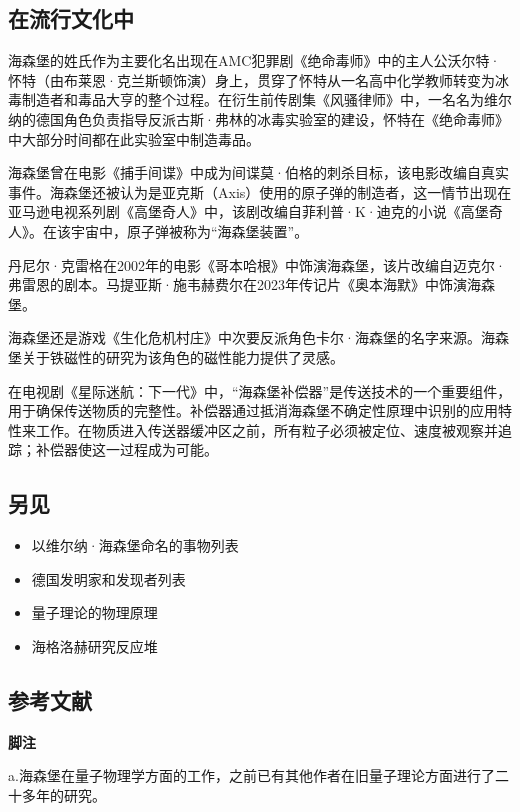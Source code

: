 \subsection{在流行文化中}
海森堡的姓氏作为主要化名出现在AMC犯罪剧《绝命毒师》中的主人公沃尔特·怀特（由布莱恩·克兰斯顿饰演）身上，贯穿了怀特从一名高中化学教师转变为冰毒制造者和毒品大亨的整个过程。在衍生前传剧集《风骚律师》中，一名名为维尔纳的德国角色负责指导反派古斯·弗林的冰毒实验室的建设，怀特在《绝命毒师》中大部分时间都在此实验室中制造毒品。

海森堡曾在电影《捕手间谍》中成为间谍莫·伯格的刺杀目标，该电影改编自真实事件。海森堡还被认为是亚克斯（Axis）使用的原子弹的制造者，这一情节出现在亚马逊电视系列剧《高堡奇人》中，该剧改编自菲利普·K·迪克的小说《高堡奇人》。在该宇宙中，原子弹被称为“海森堡装置”。

丹尼尔·克雷格在2002年的电影《哥本哈根》中饰演海森堡，该片改编自迈克尔·弗雷恩的剧本。马提亚斯·施韦赫费尔在2023年传记片《奥本海默》中饰演海森堡。

海森堡还是游戏《生化危机村庄》中次要反派角色卡尔·海森堡的名字来源。海森堡关于铁磁性的研究为该角色的磁性能力提供了灵感。

在电视剧《星际迷航：下一代》中，“海森堡补偿器”是传送技术的一个重要组件，用于确保传送物质的完整性。补偿器通过抵消海森堡不确定性原理中识别的应用特性来工作。在物质进入传送器缓冲区之前，所有粒子必须被定位、速度被观察并追踪；补偿器使这一过程成为可能。
\subsection{另见}
\begin{itemize}
\item 以维尔纳·海森堡命名的事物列表
\item 德国发明家和发现者列表
\item 量子理论的物理原理
\item 海格洛赫研究反应堆
\end{itemize}
\subsection{参考文献 } 
\textbf{脚注}

a.海森堡在量子物理学方面的工作，之前已有其他作者在旧量子理论方面进行了二十多年的研究。

